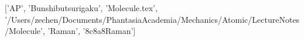 ['AP', 'Bunshibutsurigaku', 'Molecule.tex', '/Users/zechen/Documents/PhantasiaAcademia/Mechanics/Atomic/LectureNotes/Molecule', 'Raman', '\x8c\xaf{}\x8a\xa8Raman']
